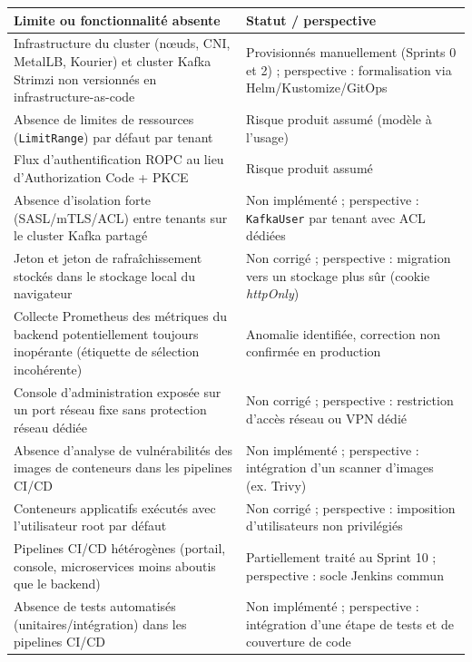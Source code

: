 \begin{table}[!ht]
\begin{center}
     \begin{tabular}{|p{6.5cm}|p{7cm}|}
     \hline
     \textbf{Limite ou fonctionnalité absente} & \textbf{Statut / perspective} \\
     \hline
     Infrastructure du cluster (nœuds, CNI, MetalLB, Kourier) et cluster Kafka Strimzi non versionnés en infrastructure-as-code & Provisionnés manuellement (Sprints 0 et 2) ; perspective : formalisation via Helm/Kustomize/GitOps \\
     \hline
     Absence de limites de ressources (\texttt{LimitRange}) par défaut par tenant & Risque produit assumé (modèle à l'usage) \\
     \hline
     Flux d'authentification ROPC au lieu d'Authorization Code + PKCE & Risque produit assumé \\
     \hline
     Absence d'isolation forte (SASL/mTLS/ACL) entre tenants sur le cluster Kafka partagé & Non implémenté ; perspective : \texttt{KafkaUser} par tenant avec ACL dédiées \\
     \hline
     Jeton et jeton de rafraîchissement stockés dans le stockage local du navigateur & Non corrigé ; perspective : migration vers un stockage plus sûr (cookie \textit{httpOnly}) \\
     \hline
     Collecte Prometheus des métriques du backend potentiellement toujours inopérante (étiquette de sélection incohérente) & Anomalie identifiée, correction non confirmée en production \\
     \hline
     Console d'administration exposée sur un port réseau fixe sans protection réseau dédiée & Non corrigé ; perspective : restriction d'accès réseau ou VPN dédié \\
     \hline
     Absence d'analyse de vulnérabilités des images de conteneurs dans les pipelines CI/CD & Non implémenté ; perspective : intégration d'un scanner d'images (ex. Trivy) \\
     \hline
     Conteneurs applicatifs exécutés avec l'utilisateur root par défaut & Non corrigé ; perspective : imposition d'utilisateurs non privilégiés \\
     \hline
     Pipelines CI/CD hétérogènes (portail, console, microservices moins aboutis que le backend) & Partiellement traité au Sprint 10 ; perspective : socle Jenkins commun \\
     \hline
     Absence de tests automatisés (unitaires/intégration) dans les pipelines CI/CD & Non implémenté ; perspective : intégration d'une étape de tests et de couverture de code \\

\end{tabular}
\end{center}
\end{table}
